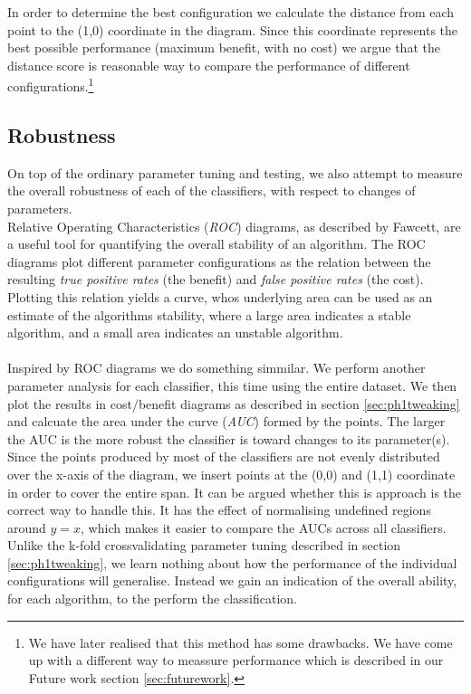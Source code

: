 %
In order to determine the best configuration we calculate the distance from each point to the (1,0) coordinate in the diagram. Since this coordinate represents the best possible performance (maximum benefit, with no cost) we argue that the distance score is reasonable way to compare the performance of different configurations.\footnote{We have later realised that this method has some drawbacks. We have come up with a different way to meassure performance which is described in our Future work section \ref{sec:futurework}.}\\
%
\subsection{Robustness}\label{sec:robustness}
%
On top of the ordinary parameter tuning and testing, we also attempt to measure the overall robustness of each of the classifiers, with respect to changes of parameters.\\
Relative Operating Characteristics (\textit{ROC}) diagrams, as described by Fawcett\cite{Fawcett06a}, are a useful tool for quantifying the overall stability of an algorithm. The ROC diagrams plot different parameter configurations as the relation between the resulting \textit{true positive rates} (the benefit) and \textit{false positive rates} (the cost). Plotting this relation yields a curve, whos underlying area can be used as an estimate of the algorithms stability, where a large area indicates a stable algorithm, and a small area indicates an unstable algorithm.\\
\\
Inspired by ROC diagrams we do something simmilar. We perform another parameter analysis for each classifier, this time using the entire dataset. We then plot the results in cost/benefit diagrams as described in section \ref{sec:ph1tweaking} and calcuate the area under the curve (\textit{AUC}) formed by the points. The larger the AUC is the more robust the classifier is toward changes to its parameter(s). Since the points produced by most of the classifiers are not evenly distributed over the x-axis of the diagram, we insert points at the (0,0) and (1,1) coordinate in order to cover the entire span. It can be argued whether this is approach is the correct way to handle this. It has the effect of normalising undefined regions around $y=x$, which makes it easier to compare the AUCs across all classifiers.\\
Unlike the k-fold crossvalidating parameter tuning described in section \ref{sec:ph1tweaking}, we learn nothing about how the performance of the individual configurations will generalise. Instead we gain an indication of the overall ability, for each algorithm, to the perform the classification.
%
